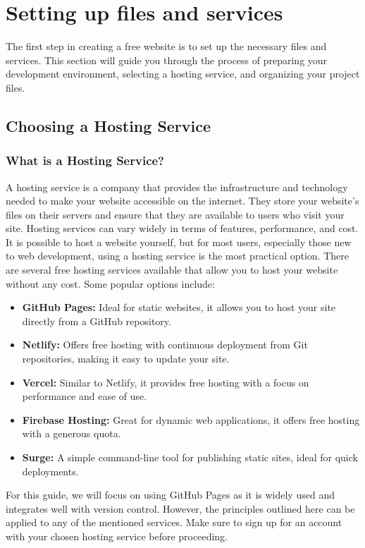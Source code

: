 \section{Setting up files and services}

The first step in creating a free website is to set up the necessary files and services. This section will guide you through the process of preparing your development environment, selecting a hosting service, and organizing your project files.

\subsection{Choosing a Hosting Service}

\subsubsection{What is a Hosting Service?}
A hosting service is a company that provides the infrastructure and technology needed to make your website accessible on the internet. They store your website's files on their servers and ensure that they are available to users who visit your site. Hosting services can vary widely in terms of features, performance, and cost. It is possible to host a website yourself, but for most users, especially those new to web development, using a hosting service is the most practical option. There are several free hosting services available that allow you to host your website without any cost. Some popular options include:
\begin{itemize}
    \item \textbf{GitHub Pages:} Ideal for static websites, it allows you to host your site directly from a GitHub repository.%
    \item \textbf{Netlify:} Offers free hosting with continuous deployment from Git repositories, making it easy to update your site.
    \item \textbf{Vercel:} Similar to Netlify, it provides free hosting with a focus on performance and ease of use.
    \item \textbf{Firebase Hosting:} Great for dynamic web applications, it offers free hosting with a generous quota.
    \item \textbf{Surge:} A simple command-line tool for publishing static sites, ideal for quick deployments.
\end{itemize}

For this guide, we will focus on using GitHub Pages as it is widely used and integrates well with version control. However, the principles outlined here can be applied to any of the mentioned services. Make sure to sign up for an account with your chosen hosting service before proceeding.

